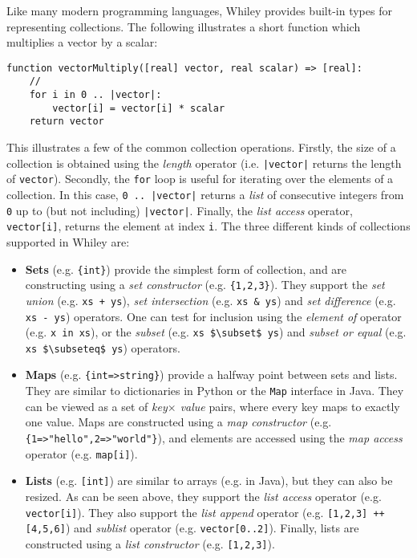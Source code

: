 Like many modern programming languages, Whiley provides built-in types
for representing collections.  The following illustrates a short
function which multiplies a vector by a scalar:
\begin{lstlisting}
function vectorMultiply([real] vector, real scalar) => [real]:
    //
    for i in 0 .. |vector|:
        vector[i] = vector[i] * scalar
    return vector
\end{lstlisting}
This illustrates a few of the common collection operations.  Firstly,
the size of a collection is obtained using the {\em length} operator
(i.e. \lstinline{|vector|} returns the length of \lstinline{vector}).
Secondly, the \lstinline{for} loop is useful for iterating over the
elements of a collection.  In this case, \lstinline{0 .. |vector|}
returns a {\em list} of consecutive integers from \lstinline{0} up to
(but not including) \lstinline{|vector|}.  Finally, the {\em list
  access} operator, \lstinline{vector[i]}, returns the element at
index \lstinline{i}.  The three different kinds of collections
supported in Whiley are:
\begin{itemize}
\item {\bf Sets} (e.g. \lstinline|{int}|) provide the simplest form of collection, and are constructing using a {\em set constructor} (e.g. \lstinline|{1,2,3}|).  They support the {\em set union} (e.g. \lstinline{xs + ys}), {\em set intersection} (e.g. \lstinline{xs & ys}) and {\em set difference} (e.g. \lstinline{xs - ys}) operators.  One can test for inclusion using the {\em element of} operator (e.g. \lstinline{x in xs}), or the {\em subset} (e.g. \lstinline{xs $\subset$ ys}) and {\em subset or equal} (e.g. \lstinline{xs $\subseteq$ ys}) operators.
  
\item {\bf Maps} (e.g. \lstinline|{int=>string}|) provide a halfway point between sets and lists.  They are similar to dictionaries in Python or the \lstinline{Map} interface in Java.  They can be viewed as a set of {\em key$\times$ value} pairs, where every key maps to exactly one value.  Maps are constructed using a {\em map constructor} (e.g. \lstinline|{1=>"hello",2=>"world"}|), and elements are accessed using the {\em map access} operator (e.g. \lstinline{map[i]}).  

\item {\bf Lists} (e.g. \lstinline{[int]}) are similar to arrays
  (e.g. in Java), but they can also be resized.  As can be seen above,
  they support the {\em list access} operator
  (e.g. \lstinline{vector[i]}).  They also support the {\em list
    append} operator (e.g. \lstinline{[1,2,3] ++ [4,5,6]}) and {\em
    sublist} operator (e.g. \lstinline{vector[0..2]}).  Finally, lists are constructed using a {\em list constructor} (e.g. \lstinline{[1,2,3]}).

\end{itemize}

